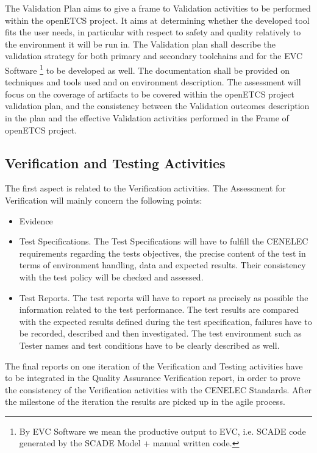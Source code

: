 \documentclass[openetcs]{template/openetcs_article}
\begin{document}
The Validation Plan aims to give a frame to Validation activities to be performed within the openETCS project. It aims at determining whether the developed tool
fits the user needs, in particular with respect to safety and quality relatively to the environment it will be run in.
The Validation plan shall describe the validation strategy for both primary and secondary toolchains and for the EVC Software \footnote{By EVC Software we mean the productive output to EVC, i.e. SCADE code generated by the SCADE Model + manual written code.} to be developed as well. The
documentation shall be provided on techniques and tools used and on environment description. The assessment will focus on the coverage of artifacts to be
covered within the openETCS project validation plan, and the consistency between the Validation outcomes description in the plan and the effective Validation
activities performed in the Frame of openETCS project.

\subsection{Verification and Testing Activities}
The first aspect is related to the Verification activities. The Assessment for Verification will mainly concern the following points:
\begin{itemize}
\item Evidence
\item Test Specifications. The Test Specifications will have to fulfill the CENELEC requirements regarding the tests objectives, the precise content of the test
in terms of environment handling, data and expected results. Their consistency with the test policy will be checked and assessed.
\item Test Reports. The test reports will have to report as precisely as possible the information related to the test performance. The test results are compared
with the expected results defined during the test specification, failures have to be recorded, described and then investigated. The test environment such as
Tester names and test conditions have to be clearly described as well.
\end{itemize}
The final reports on one iteration of the Verification and Testing activities have to be integrated in the Quality Assurance Verification report, in order to prove the
consistency of the Verification activities with the CENELEC Standards. After the milestone of the iteration the results are picked up in the agile process.
\end{document}

